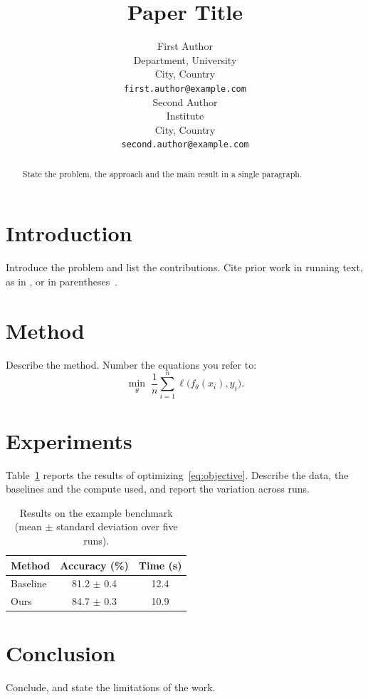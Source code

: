 \documentclass{article}
\title{Paper Title}
\author{%
  First Author \\
  Department, University \\
  City, Country \\
  \texttt{first.author@example.com} \\
  \And
  Second Author \\
  Institute \\
  City, Country \\
  \texttt{second.author@example.com} \\
}
\begin{document}
\maketitle

\begin{abstract}
  State the problem, the approach and the main result in a single
paragraph.
\end{abstract}

\section{Introduction}
Introduce the problem and list the contributions. Cite prior work in
running text, as in \citet{knuth1984texbook}, or in
parentheses~\citep{lamport1994latex}.

\section{Method}
Describe the method. Number the equations you refer to:
\begin{equation}
  \label{eq:objective}
  \min_{\theta} \; \frac{1}{n} \sum_{i=1}^{n} \ell\bigl(f_\theta(x_i), y_i\bigr) .
\end{equation}

\section{Experiments}
Table~\ref{tab:results} reports the results of
optimizing~\eqref{eq:objective}. Describe the data, the baselines and the
compute used, and report the variation across runs.

\begin{table}[!htb]
  \caption{Results on the example benchmark (mean $\pm$ standard deviation over five runs).}
  \label{tab:results}
  \centering
  \begin{tabular}{lcc}
    \toprule
    Method   & Accuracy (\%)  & Time (s) \\
    \midrule
    Baseline & 81.2 $\pm$ 0.4 & 12.4     \\
    Ours     & 84.7 $\pm$ 0.3 & 10.9     \\
    \bottomrule
  \end{tabular}
\end{table}

\section{Conclusion}
Conclude, and state the limitations of the work.
\end{document}
